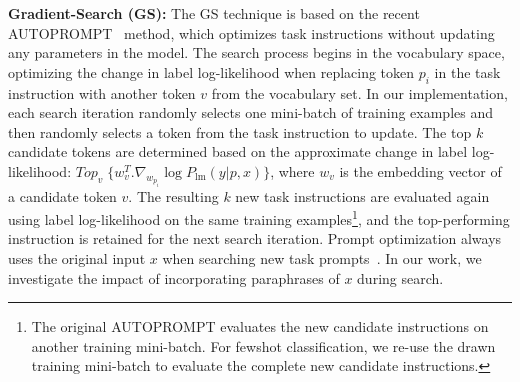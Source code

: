 \documentclass[11pt]{article}
\begin{document}
\textbf{Gradient-Search (GS):}
The GS technique is based on the recent AUTOPROMPT~\cite{shin-etal-2020-autoprompt} method, which optimizes task instructions without updating any parameters in the model. The search process begins in the vocabulary space, optimizing the change in label log-likelihood when replacing token $p_{i}$ in the task instruction with another token $v$ from the vocabulary set. In our implementation, each search iteration randomly selects one mini-batch of training examples and then randomly selects a token from the task instruction to update. The top $k$ candidate tokens are determined based on the approximate change in label log-likelihood: $Top_v \; \{w^{T}_{v} . \nabla_{w_{p_i}} \log P_{\text{lm}}(y|p,x)\}$, where $w_v$ is the embedding vector of a candidate token $v$. The resulting $k$ new task instructions are evaluated again using label log-likelihood on the same training examples\footnote{The original AUTOPROMPT evaluates the new candidate instructions on another training mini-batch. For fewshot classification, we re-use the drawn training mini-batch to evaluate the complete new candidate instructions.}, and the top-performing instruction is retained for the next search iteration. Prompt optimization always uses the original input $x$ when searching new task prompts~\cite{shin-etal-2020-autoprompt, deng-etal-2022-rlprompt}. In our work, we investigate the impact of incorporating paraphrases of $x$ during search.

\end{document}

